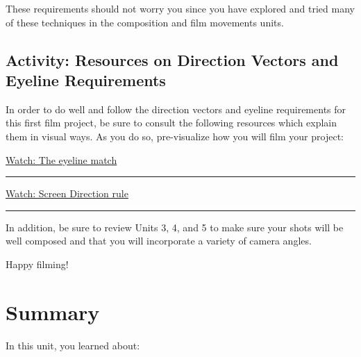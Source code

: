 \documentclass[
]{book}
\begin{document}
These requirements should not worry you since you have explored and tried many of these techniques in the composition and film movements units.

\hypertarget{activity-resources-on-direction-vectors-and-eyeline-requirements}{%
\subsection*{Activity: Resources on Direction Vectors and Eyeline Requirements}\label{activity-resources-on-direction-vectors-and-eyeline-requirements}}

\begin{reflect}
In order to do well and follow the direction vectors and eyeline requirements for this first film project, be sure to consult the following resources which explain them in visual ways. As you do so, pre-visualize how you will film your project:

\href{https://www.youtube.com/watch?v=y_1H6V7uyYc}{Watch: The eyeline match}

\begin{center}\rule{0.5\linewidth}{0.5pt}\end{center}

\href{https://www.youtube.com/watch?v=9XOn5uxdSJc}{Watch: Screen Direction rule}

\begin{center}\rule{0.5\linewidth}{0.5pt}\end{center}

In addition, be sure to review Units 3, 4, and 5 to make sure your shots will be well composed and that you will incorporate a variety of camera angles.

Happy filming!
\end{reflect}

\hypertarget{summary-5}{%
\section*{Summary}\label{summary-5}}

In this unit, you learned about:
\end{document}
